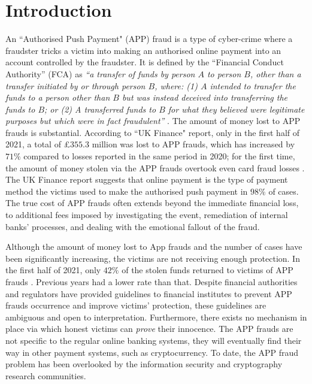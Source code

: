 

\section{Introduction}

An  ``Authorised Push Payment" (APP) fraud is a type of cyber-crime where a fraudster tricks a victim into making an authorised online payment into an account controlled by the fraudster. It is defined by the ``Financial Conduct Authority” (FCA) as \textit{``a transfer of funds by person $A$ to person $B$, other than a transfer initiated by or through person $B$, where: (1) $A$ intended to transfer the funds to a person other than $B$ but was instead deceived into transferring the funds to $B$; or (2) A transferred funds to $B$ for what they believed were legitimate purposes but which were in fact fraudulent''} \cite{FCA-Glossary}. The amount of money lost to  APP frauds is   substantial. According to  ``UK Finance" report,   only in the first half of 2021, a total of £$355.3$ million was lost to APP frauds, which has increased by  $71\%$  compared to losses reported in the same period in 2020; for the first time, the amount of money stolen via the APP frauds overtook even   card fraud losses \cite{2021-Half-Year-Fraud-Update}. The UK Finance report suggests that  online  payment is the type of payment method the victims used to make the authorised push payment in  $98\%$  of cases. The true cost of APP frauds often extends beyond the immediate financial loss,  to additional fees imposed by  investigating the event, remediation of internal banks' processes, and  dealing with the emotional fallout of the fraud. %


Although the amount of money lost to  App frauds and the number of cases have been significantly  increasing, the victims are not receiving  enough protection.   In the first half of 2021, only $42\%$ of the stolen funds returned to victims of  APP frauds \cite{2021-Half-Year-Fraud-Update}. Previous years had a lower rate than that. Despite   financial authorities and regulators have provided  guidelines to financial institutes to prevent  APP frauds occurrence and improve victims' protection, these guidelines are  ambiguous and    open to interpretation. Furthermore,  there exists  no  mechanism in place via which honest victims can  \emph{prove} their innocence. The APP frauds are not specific to the regular online banking systems, they will eventually find their way in other payment systems, such as cryptocurrency. To date, the APP fraud problem has been overlooked by the information security and cryptography research communities.


